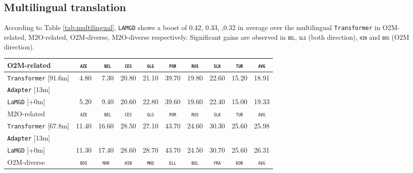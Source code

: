 \documentclass[11pt]{article}
\newcommand{\revision}[1]{\textcolor{black}{#1}}
\newcommand{\domain}[1]{\texttt{\textsc{#1}}}
\newcommand{\system}[1]{\texttt{{#1}}}
\begin{document}
\subsection{Multilingual translation}
According to Table \ref{tab:multilingual}, \system{LAMGD} shows a boost of 0.42, 0.33, ,0.32 in average over the multilingual \system{Transformer} in O2M-related, M2O-related, O2M-diverse, M2O-diverse respectively. Significant gains are observed in \domain{bel}, \domain{glg} (both direction), \domain{hin} and \domain{bos} (O2M direction).
\begin{table*}[ht]
  \centering
  \begin{tabular}{|p{4cm}|*{9}{r|}} \hline
    O2M-related & \multicolumn{1}{c|}{\domain{aze}} & \multicolumn{1}{c|}{\domain{ bel}} & \multicolumn{1}{c|}{\domain{ces}} & \multicolumn{1}{c|}{\domain{glg}} & \multicolumn{1}{c|}{\domain{por}} & \multicolumn{1}{c|}{\domain{rus}} & \multicolumn{1}{c|}{\domain{slk}} & \multicolumn{1}{c|}{\domain{tur}} & \multicolumn{1}{c|}{\domain{avg}} \\ \hline 
    \system{Transformer}  \hfill{\footnotesize[91.6m]} & 4.80 &7.30&20.80&21.10&39.70&19.80&22.60&15.20&18.91 \\
    \revision{\system{Adapter}}   \hfill{\footnotesize[13m]} & & & & & & & & & \\ 
    \system{LaMGD}  \hfill{\footnotesize[+0m]}  & 5.20&9.40&20.60&22.80&39.60&19.60&22.40&15.00&19.33 \\ 
	\hline
    \hline
    M2O-related & \multicolumn{1}{c|}{\domain{aze}} & \multicolumn{1}{c|}{\domain{ bel}} & \multicolumn{1}{c|}{\domain{ces}} & \multicolumn{1}{c|}{\domain{glg}} & \multicolumn{1}{c|}{\domain{por}} & \multicolumn{1}{c|}{\domain{rus}} & \multicolumn{1}{c|}{\domain{slk}} & \multicolumn{1}{c|}{\domain{tur}} & \multicolumn{1}{c|}{\domain{avg}} \\ \hline 
    \system{Transformer}  \hfill{\footnotesize[67.8m]} &11.40&16.60&28.50&	27.10&43.70&24.60&30.30&25.60&25.98 \\
    \revision{\system{Adapter}}   \hfill{\footnotesize[13m]} & & & & & & & & & \\ 
    \system{LaMGD}   \hfill{\footnotesize[+0m]}  &11.30&17.40&28.60&28.70&	43.70&24.50&30.70&25.60&26.31 \\ 
    \hline
    \hline
    O2M-diverse & \multicolumn{1}{c|}{\domain{bos}} & \multicolumn{1}{c|}{\domain{mar}} & \multicolumn{1}{c|}{\domain{hin}} & \multicolumn{1}{c|}{\domain{mkd}} & \multicolumn{1}{c|}{\domain{ell}} & \multicolumn{1}{c|}{\domain{bul}} & \multicolumn{1}{c|}{\domain{fra}} & \multicolumn{1}{c|}{\domain{kor}} & \multicolumn{1}{c|}{\domain{avg}} \\ \hline 

\end{tabular}
\end{table*}
\end{document}
